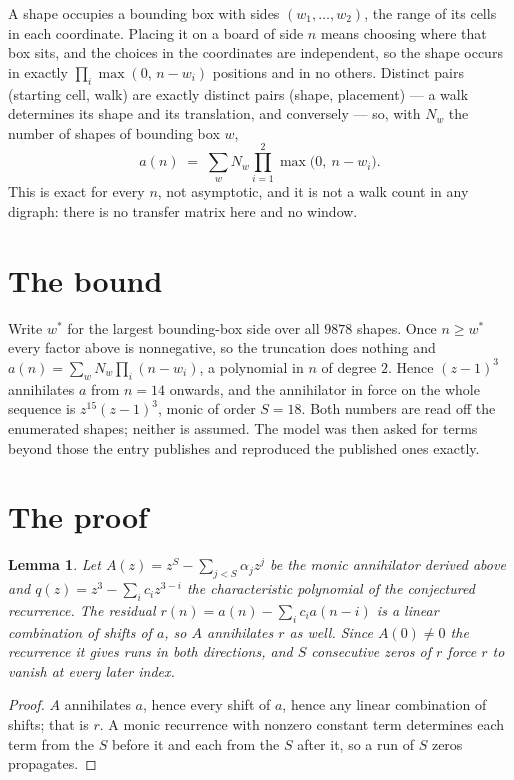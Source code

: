 \documentclass[11pt,a4paper]{article}
\theoremstyle{plain}
\newtheorem{lemma}[theorem]{Lemma}
\theoremstyle{definition}
\begin{document}
A shape occupies a bounding box with sides $(w_1,\dots,w_{2})$, the range of its cells in each
coordinate. Placing it on a board of side $n$ means choosing where that box sits, and the
choices in the coordinates are independent, so the shape occurs in exactly
$\prod_{i}\max(0,\,n-w_i)$ positions and in no others. Distinct pairs (starting cell,
walk) are exactly distinct pairs (shape, placement) --- a walk determines its shape and its
translation, and conversely --- so, with $N_w$ the number of shapes of bounding box $w$,
\[
a(n)\;=\;\sum_{w} N_w \prod_{i=1}^{2}\max\bigl(0,\ n-w_i\bigr).
\]
This is exact for every $n$, not asymptotic, and it is not a walk count in any digraph: there is
no transfer matrix here and no window.

\section{The bound}

Write $w^\ast$ for the largest bounding-box side over all $9878$ shapes. Once $n\ge w^\ast$
every factor above is nonnegative, so the truncation does nothing and
$a(n)=\sum_w N_w\prod_i(n-w_i)$, a polynomial in $n$ of degree $2$. Hence $(z-1)^{3}$
annihilates $a$ from $n=14$ onwards, and the annihilator in force on the whole sequence is
$z^{15}(z-1)^{3}$, monic of order $S=18$. Both numbers are read off the enumerated
shapes; neither is assumed. The model was then asked for terms beyond those the entry publishes
and reproduced the published ones exactly.

\section{The proof}

\begin{lemma}\label{lem:crit}
Let $A(z)=z^S-\sum_{j<S}\alpha_jz^{j}$ be the monic annihilator derived above and
$q(z)=z^{3}-\sum_ic_iz^{3-i}$ the characteristic polynomial of the conjectured
recurrence. The residual $r(n)=a(n)-\sum_ic_ia(n-i)$ is a linear combination of shifts of $a$,
so $A$ annihilates $r$ as well. Since $A(0)\ne0$ the recurrence it gives runs in both
directions, and $S$ consecutive zeros of $r$ force $r$ to vanish at every later index.
\end{lemma}

\begin{proof}
$A$ annihilates $a$, hence every shift of $a$, hence any linear combination of shifts; that is
$r$. A monic recurrence with nonzero constant term determines each term from the $S$ before it
and each from the $S$ after it, so a run of $S$ zeros propagates.
\end{proof}
\end{document}
